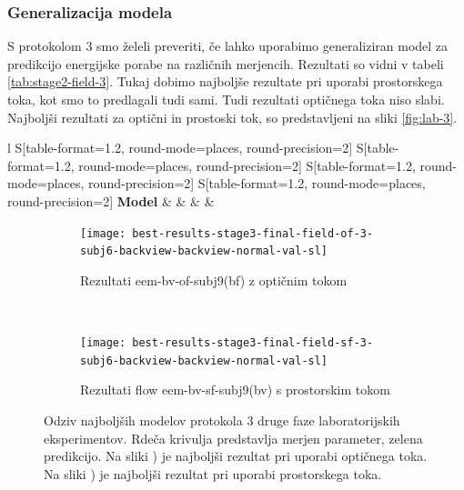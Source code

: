\subsubsection{Generalizacija modela}
S protokolom 3 smo želeli preveriti, če lahko uporabimo generaliziran model za predikcijo energijske porabe na različnih merjencih. Rezultati so vidni v tabeli \ref{tab:stage2-field-3}. Tukaj dobimo najboljše rezultate pri uporabi prostorskega toka, kot smo to predlagali tudi sami. Tudi rezultati optičnega toka niso slabi. Najboljši rezultati za optični in prostoski tok, so predstavljeni na sliki \ref{fig:lab-3}.

\begin{table}[!htbp]
	\centering
	\begin{tabular}{l S[table-format=1.2, round-mode=places, round-precision=2] S[table-format=1.2, round-mode=places, round-precision=2] S[table-format=1.2, round-mode=places, round-precision=2] S[table-format=1.2, round-mode=places, round-precision=2]}
		\toprule
		\textbf{Model} &  &  &  &  \\
		\midrule
		\bottomrule
	\end{tabular}
	\caption{Validacijske metrike za protokol 3 druge faze terenskih eksperimentov.}
	\label{tab:stage2-field-3}
\end{table}

\begin{figure}[!htbp]
	\centering
	\begin{subfigure}[t]{0.45\columnwidth}
		\texttt{[image: best-results-stage3-final-field-of-3-subj6-backview-backview-normal-val-sl]}
		\caption{Rezultati eem-bv-of-subj9(bf) z optičnim tokom}
		\label{fig:field-of-3}
	\end{subfigure}
	~
	\begin{subfigure}[t]{0.45\columnwidth}
		\texttt{[image: best-results-stage3-final-field-sf-3-subj6-backview-backview-normal-val-sl]}
		\caption{Rezultati flow eem-bv-sf-subj9(bv) s prostorskim tokom}
		\label{fig:field-sf-3}
	\end{subfigure}
	\caption[Odziv SUBJ9 modelov protokola 3 druge faze laboratorijskih eksperimentov]{Odziv najboljših modelov protokola 3 druge faze laboratorijskih eksperimentov. Rdeča krivulja predstavlja merjen parameter, zelena predikcijo. Na sliki ) je najboljši rezultat pri uporabi optičnega toka. Na sliki ) je najboljši rezultat pri uporabi prostorskega toka.}
	\label{fig:field-3}
\end{figure}











